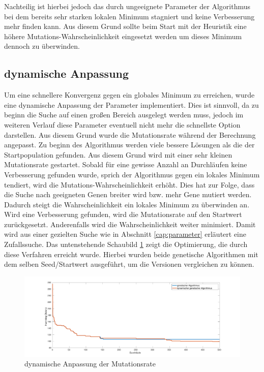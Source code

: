 Nachteilig ist hierbei jedoch das durch ungeeignete Parameter der Algorithmus bei dem bereits sehr starken lokalen Minimum stagniert und keine Verbesserung mehr finden kann. Aus diesem Grund sollte beim Start mit der Heuristik eine höhere Mutations-Wahrscheinlichkeit eingesetzt werden um dieses Minimum dennoch zu überwinden.

\subsection{dynamische Anpassung}
Um eine schnellere Konvergenz gegen ein globales Minimum zu erreichen, wurde eine dynamische Anpassung der Parameter implementiert. Dies ist sinnvoll, da zu beginn die Suche auf einen großen Bereich ausgelegt werden muss, jedoch im weiteren Verlauf diese Parameter eventuell nicht mehr die schnellste Option darstellen. Aus diesem Grund wurde die Mutationsrate während der Berechnung angepasst. Zu beginn des Algorithmus werden viele bessere Lösungen als die der Startpopulation gefunden. Aus diesem Grund wird mit einer sehr kleinen Mutationsrate gestartet. Sobald für eine gewisse Anzahl an Durchläufen keine Verbesserung gefunden wurde, sprich der Algorithmus gegen ein lokales Minimum tendiert, wird die Mutations-Wahrscheinlichkeit erhöht. Dies hat zur Folge, dass die Suche nach geeigneten Genen breiter wird bzw. mehr Gene mutiert werden. Dadurch steigt die Wahrscheinlichkeit ein lokales Minimum zu überwinden an. Wird eine Verbesserung gefunden, wird die Mutationsrate auf den Startwert zurückgesetzt. Anderenfalls wird die Wahrscheinlichkeit weiter minimiert. Damit wird aus einer gezielten Suche wie in Abschnitt \ref{cap:parameter} erläutert eine Zufallssuche.
Das untenstehende Schaubild \ref{fig:dyn_genetic} zeigt die Optimierung, die durch diese Verfahren erreicht wurde. Hierbei wurden beide genetische Algorithmen mit dem selben Seed/Startwert ausgeführt, um die Versionen vergleichen zu können.

\begin{figure}[H]
	\centering
	\includegraphics[width=\textwidth]{fig/dyn_genetic.pdf}
	\caption{dynamische Anpassung der Mutationsrate}
	\label{fig:dyn_genetic}
\end{figure}
 
